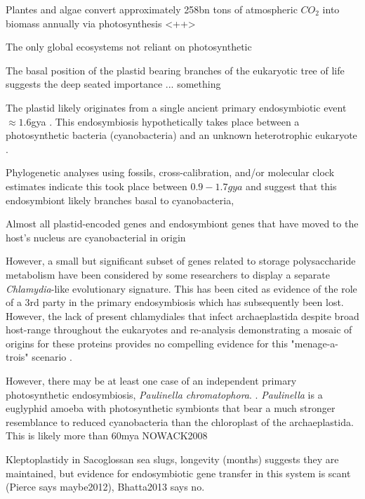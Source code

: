 Plantes and algae convert approximately 258bn tons of atmospheric \(CO_{2}\) into biomass
annually via photosynthesis \citep{}<++>




The only global ecosystems not reliant on photosynthetic 




The basal position of the plastid bearing branches of the eukaryotic tree of life %
suggests the deep seated importance ... something \citep{Yoon2004}


The plastid likely originates from a single ancient primary endosymbiotic event \(\approx 1.6\)gya \citep{Yoon2004}.
This endosymbiosis hypothetically takes place between a photosynthetic bacteria (cyanobacteria) and
an unknown heterotrophic eukaryote \citep{Reyes-Prieto2007}.


Phylogenetic analyses using fossils, cross-calibration, and/or molecular clock estimates indicate 
this took place between \(0.9-1.7gya\) \citep{Yoon2004,Parfrey2011,Shih2013,McFadden2014} and 
suggest that this endosymbiont likely branches basal to cyanobacteria, 



Almost all plastid-encoded genes and endosymbiont genes that have moved to the host's nucleus are 
cyanobacterial in origin 


However, a small but significant subset of genes related to storage polysaccharide metabolism have been 
considered by some researchers to display a separate \textit{Chlamydia}-like evolutionary signature.
This has been cited as evidence of the role of a 3rd party in the primary endosymbiosis which has subsequently
been lost.  However, the lack of present chlamydiales that infect archaeplastida despite broad host-range throughout 
the eukaryotes and re-analysis demonstrating a mosaic of origins for these proteins provides no compelling
evidence for this "menage-a-trois" scenario \citep{Domman2015}.




However, there may be at least one case of an independent primary photosynthetic endosymbiosis, \textit{Paulinella chromatophora}.
\citep{McFadden2014}. \textit{Paulinella} is a euglyphid amoeba with photosynthetic symbionts that bear a much stronger
resemblance to reduced cyanobacteria than the chloroplast of the archaeplastida.  
This is likely more than 60mya  NOWACK2008


Kleptoplastidy in Sacoglossan sea slugs, longevity (months) suggests they are maintained, 
but evidence for endosymbiotic gene transfer in this system is scant (Pierce says maybe2012), Bhatta2013 says no.


